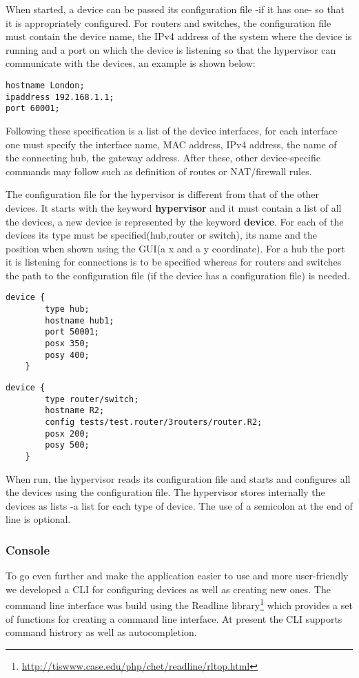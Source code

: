 {{When started, a device can be passed its configuration file -if it has one- so that it is appropriately configured.
For routers and switches, the configuration file must contain the device name, the IPv4 address of the system where the device is running and a port on which the device is listening so that the hypervisor can communicate with the devices, an example is shown below:
\lstset{language=zsh,caption=Fields of Configuration File,label=lst:config-file}
\begin{lstlisting}
hostname London;
ipaddress 192.168.1.1;
port 60001;
\end{lstlisting}
Following these specification is a list of the device interfaces, for each interface one must specify the interface name, MAC address, IPv4 address, the name of the connecting hub, the gateway address. After these, other device-specific commands may follow such as definition of routes or NAT/firewall rules.

The configuration file for the hypervisor is different from that of the other devices. It starts with the keyword \textbf{hypervisor} and it must contain a list of all the devices, a new device is represented by the keyword \textbf{device}. For each of the devices its type must be specified(hub,router or switch), its name and the position when shown using the GUI(a x and a y coordinate). For a hub the port it is listening for connections is to be specified whereas for routers and switches the path to the configuration file (if the device has a configuration file) is needed.    
\lstset{language=zsh,caption=Listing a Hub in hypervisor configuration file,label=lst:hy-config-file}
\begin{lstlisting}
device {
		type hub;
		hostname hub1;
		port 50001;
		posx 350;
		posy 400;
	}
\end{lstlisting}
\lstset{language=zsh,caption=Listing a Router/Switch in hypervisor configuration file,label=lst:hy-config-file}
\begin{lstlisting}
device {
		type router/switch;
		hostname R2;
		config tests/test.router/3routers/router.R2;
		posx 200;
		posy 500;
	}
\end{lstlisting}
When run, the hypervisor reads its configuration file and starts and configures all the devices using the configuration file.
The hypervisor stores internally the devices as lists -a list for each type of device. 
The use of a semicolon at the end of line is optional.  
\subsubsection*{Console}
\label{subsubsec:impl-console}
To go even further and make the application easier to use and more user-friendly we developed a CLI for configuring devices as well as creating new ones. The command line interface was build using the Readline library\footnote{\url{http://tiswww.case.edu/php/chet/readline/rltop.html}} which provides a set of functions for creating a command line interface. At present the CLI supports command histrory as well as autocompletion. 

}}
